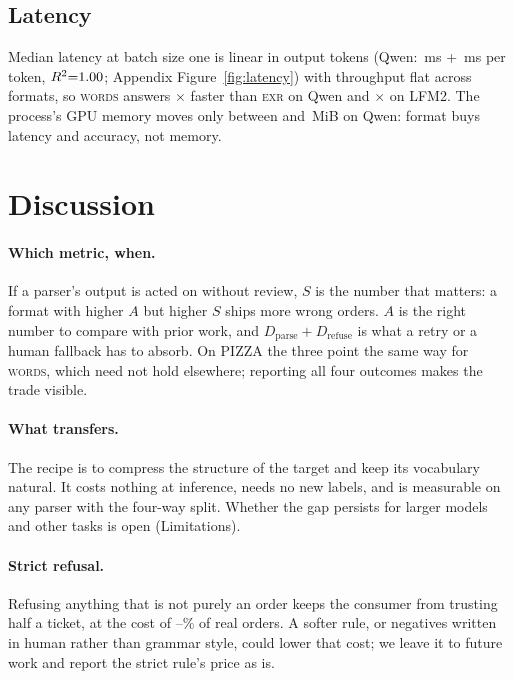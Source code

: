 \documentclass[11pt]{article}
\newcommand{\fmt}[1]{\textsc{\lowercase{#1}}}
\begin{document}
\subsection{Latency}

Median latency at batch size one is linear in output tokens (Qwen: \QmsFixed{}\,ms
+ \QmsPerTok{}\,ms per token, $R^2{=}1.00{}$; Appendix
Figure~\ref{fig:latency}) with throughput flat across formats, so \fmt{WORDS}
answers \Qspeedup{}$\times$ faster than \fmt{EXR} on Qwen and \Lspeedup{}$\times$
on LFM2. The process's GPU memory moves only between \QmemMin{} and
\QmemMax{}\,MiB on Qwen: format buys latency and accuracy, not memory.

\section{Discussion}

\paragraph{Which metric, when.}
If a parser's output is acted on without review, $S$ is the number that matters:
a format with higher $A$ but higher $S$ ships more wrong orders. $A$ is the right
number to compare with prior work, and $D_\text{parse}+D_\text{refuse}$ is what a
retry or a human fallback has to absorb. On PIZZA the three point the same way for
\fmt{WORDS}, which need not hold elsewhere; reporting all four outcomes makes the
trade visible.

\paragraph{What transfers.}
The recipe is to compress the structure of the target and keep its vocabulary
natural. It costs nothing at inference, needs no new labels, and is measurable on
any parser with the four-way split. Whether the gap persists for larger models and
other tasks is open (Limitations).

\paragraph{Strict refusal.}
Refusing anything that is not purely an order keeps the consumer from trusting
half a ticket, at the cost of \QrefuseMin{}--\LrefuseMax{}\% of real orders. A
softer rule, or negatives written in human rather than grammar style, could lower
that cost; we leave it to future work and report the strict rule's price as is.
\end{document}
